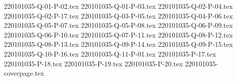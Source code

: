 \documentclass{article}                              %
\begin{document}
{220101035-Q-01-P-02.tex}
{220101035-Q-01-P-03.tex}
{220101035-Q-02-P-04.tex}
{220101035-Q-02-P-17.tex}
{220101035-Q-03-P-05.tex}
{220101035-Q-04-P-06.tex}
{220101035-Q-05-P-07.tex}
{220101035-Q-05-P-08.tex}
{220101035-Q-06-P-09.tex}
{220101035-Q-06-P-10.tex}
{220101035-Q-07-P-11.tex}
{220101035-Q-08-P-12.tex}
{220101035-Q-08-P-13.tex}
{220101035-Q-09-P-14.tex}
{220101035-Q-09-P-15.tex}
{220101035-Q-10-P-16.tex}
{220101035-Q-11-P-01.tex}
{220101035-P-17.tex}
{220101035-P-18.tex}
{220101035-P-19.tex}
{220101035-P-20.tex}
{220101035-coverpage.tex}
\end{document}
